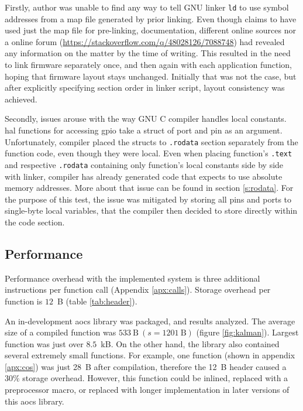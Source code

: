 Firstly, author was unable to find any way to tell GNU linker \texttt{ld} to use symbol addresses from a map file generated by prior linking. Even though \textcite{Dunkels2006} claims to have used just the map file for pre-linking, documentation, different online sources nor a online forum (\url{https://stackoverflow.com/q/48028126/7088748}) had revealed any information on the matter by the time of writing. This resulted in the need to link firmware separately once, and then again with each application function, hoping that firmware layout stays unchanged. Initially that was not the case, but after explicitly specifying section order in linker script, layout consistency was achieved.

Secondly, issues arouse with the way GNU C compiler handles local constants. \Gls{hal} functions for accessing \gls{gpio} take a struct of port and pin as an argument. Unfortunately, compiler placed the structs to \texttt{.rodata} section separately from the function code, even though they were local. Even when placing function's \texttt{.text} and respective \texttt{.rodata} containing only function's local constants side by side with linker, compiler has already generated code that expects to use absolute memory addresses. More about that issue can be found in section \ref{s:rodata}. For the purpose of this test, the issue was mitigated by storing all pins and ports to single-byte local variables, that the compiler then decided to store directly within the code section.

\subsection{Performance}

Performance overhead with the implemented system is three additional instructions per function call (Appendix \ref{apx:calls}). Storage overhead per function is $12$~B (table \ref{tab:header}).

An in-development \gls{aocs} library was packaged, and results analyzed. The average size of a compiled function was $533~\text{B}\ (s=1201~\text{B})$ (figure \ref{fig:kalman}). Largest function was just over $8.5$~kB. On the other hand, the library also contained several extremely small functions. For example, one function (shown in appendix \ref{apx:cos}) was just 28~B after compilation, therefore the 12~B header caused a $30\%$ storage overhead. However, this function could be inlined, replaced with a preprocessor macro, or replaced with longer implementation in later versions of this \gls{aocs} library.

